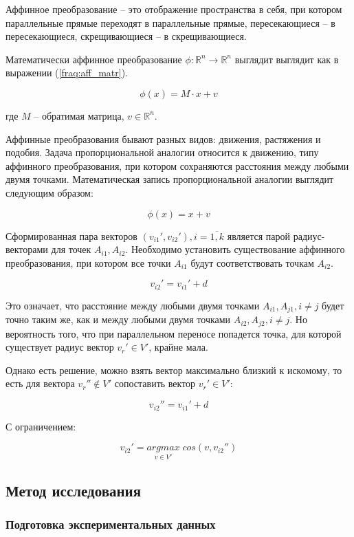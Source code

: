 \documentclass[a4paper,14pt]{article}
\begin{document}
Аффинное преобразование -- это отображение пространства в себя, при котором параллельные прямые переходят в параллельные прямые, пересекающиеся -- в пересекающиеся, скрещивающиеся -- в скрещивающиеся.

Математически аффинное преобразование $\phi : \mathbb{R}^n \rightarrow \mathbb{R}^n$ выглядит выглядит как в выражении (\ref{fraq:aff_matr}).

\begin{equation}
	\phi(x) = M \cdot x + v
	\label{fraq:aff_matr}
\end{equation}

где $M$ -- обратимая матрица, $v \in \mathbb{R}^n$.

Аффинные преобразования бывают разных видов: движения, растяжения и подобия.
Задача пропорциональной аналогии относится к движению, типу аффинного преобразования, при котором сохраняются расстояния между любыми двумя точками.
Математическая запись пропорциональной аналогии выглядит следующим образом:

$$\phi(x) =  x + v$$

Сформированная пара векторов $(v_{i1}', v_{i2}'), i = \overline{1,k}$ является парой радиус-векторами для точек $A_{i1}, A_{i2}$.
Необходимо установить существование аффинного преобразования, при котором все точки $A_{i1}$ будут соответствовать точкам $A_{i2}$.

$$v_{i2}' = v_{i1}' + d$$

Это означает, что расстояние между любыми двумя точками $A_{i1}, A_{j1}, i \neq j$ будет точно таким же, как и между любыми двумя точками $A_{i2}, A_{j2}, i \neq j$.
Но вероятность того, что при параллельном переносе попадется точка, для которой существует радиус вектор $v_r' \in V'$, крайне мала.

Однако есть решение, можно взять вектор максимально близкий к искомому, то есть для вектора $v_r'' \notin V'$ сопоставить вектор  $v_r' \in V'$:

$$v_{i2}'' = v_{i1}' + d$$

С ограничением:

$$v_{i2}' = \underset{v \in V'}{argmax} \; cos(v, v_{i2}'')$$

\subsection{Метод исследования}

\subsubsection{Подготовка экспериментальных данных}
\end{document}
